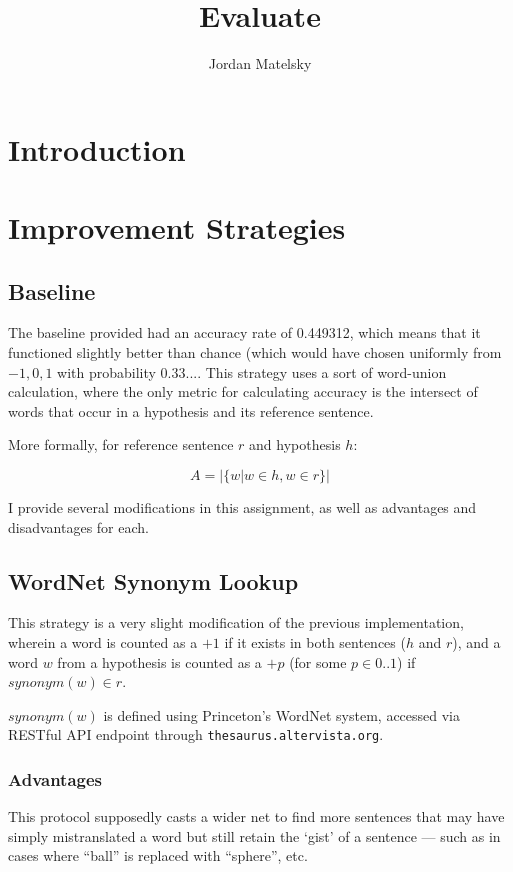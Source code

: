 \documentclass{article}
\title{Evaluate}
\author{Jordan Matelsky}
\begin{document}
\maketitle

\section{Introduction}

\section{Improvement Strategies}

\subsection{Baseline}
The baseline provided had an accuracy rate of 0.449312, which means that it functioned slightly better than chance (which would have chosen uniformly from ${-1, 0, 1}$ with probability $0.33...$. This strategy uses a sort of word-union calculation, where the only metric for calculating accuracy is the intersect of words that occur in a hypothesis and its reference sentence.

More formally, for reference sentence $r$ and hypothesis $h$:

$$A = \big| \{ w | w \in h, w \in r \} \big|$$

I provide several modifications in this assignment, as well as advantages and disadvantages for each.

\subsection{WordNet Synonym Lookup}
This strategy is a very slight modification of the previous implementation, wherein a word is counted as a $+1$ if it exists in both sentences ($h$ and $r$), and a word $w$ from a hypothesis is counted as a $+p$ (for some $p \in 0..1$) if $synonym(w) \in r$.

$synonym(w)$ is defined using Princeton's WordNet system, accessed via RESTful API endpoint through \texttt{thesaurus.altervista.org}.

\subsubsection{Advantages}
This protocol supposedly casts a wider net to find more sentences that may have simply mistranslated a word but still retain the `gist' of a sentence — such as in cases where ``ball'' is replaced with ``sphere'', etc.
\end{document}
